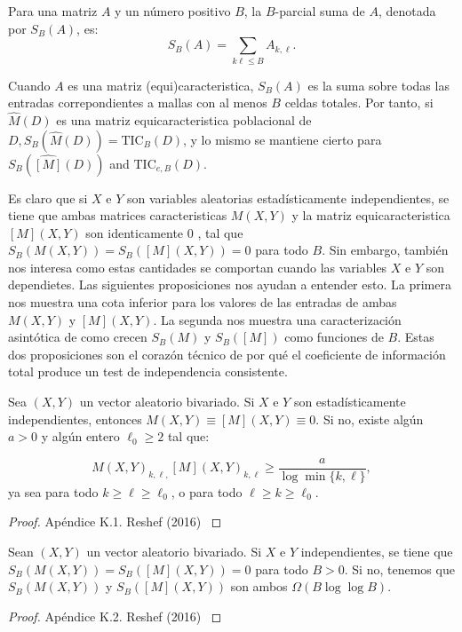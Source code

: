         \begin{defn}
            Para una matriz $A$	y un n\'umero positivo $B$, la $B$-parcial suma de 	$A$, denotada por  $S_B(A)$, es:
            $$
            S_B(A)=\sum_{k \ell \leq B} A_{k, \ell}.
            $$
            
            Cuando $A$ es una matriz (equi)caracteristica, $S_B(A)$ es la suma sobre todas las entradas correpondientes a mallas con al menos $B$ celdas totales. Por tanto, si $\widehat{M}(D)$ es una matriz equicaracteristica poblacional de $D, S_B(\widehat{M}(D))=\mathrm{TIC}_B(D)$, y lo mismo se mantiene cierto para $S_B(\widehat{[M]}(D))$ and $\mathrm{TIC}_{e, B}(D)$.
            
            Es claro que si $X$ e $Y$ son variables aleatorias estad\'isticamente independientes, se tiene que ambas matrices caracteristicas $M(X, Y)$ y la matriz equicaracteristica $[M](X, Y)$ son identicamente 0 , tal que $S_B(M(X, Y))=S_B([M](X, Y))=0$ para todo $B$. Sin embargo, tambi\'en nos interesa como estas cantidades se comportan cuando las variables $X$ e $Y$ son dependietes. Las siguientes proposiciones nos ayudan a entender esto. La primera nos muestra una cota inferior para los valores de las entradas de ambas $M(X, Y)$ y $[M](X, Y)$. La segunda nos muestra una caracterizaci\'on asint\'otica de como crecen $S_B(M)$ y $S_B([M])$ como funciones de $B$. Estas dos proposiciones son el coraz\'on t\'ecnico de por qu\'e el coeficiente de informaci\'on total produce un test de independencia consistente.
            
            \begin{prop}
                Sea $(X, Y)$ un vector aleatorio bivariado. Si $X$ e $Y$ son estad\'isticamente independientes, entonces $M(X, Y) \equiv[M](X, Y) \equiv 0$. Si no, existe alg\'un $a>0$ y alg\'un entero $\ell_0 \geq 2$ tal que:
                
                $$
                M(X, Y)_{k, \ell,}[M](X, Y)_{k, \ell} \geq \frac{a}{\log \min \{k, \ell\}},
                $$
                ya sea para todo $k \geq \ell \geq \ell_0$, o para todo $\ell \geq k \geq \ell_0$.
            \end{prop}
            \begin{proof}
                Ap\'endice K.1. Reshef (2016) \cite{Reshef2016}
            \end{proof}
            \begin{prop}
                Sean $(X, Y)$ un vector aleatorio bivariado. Si $X$ e $Y$ independientes, se tiene que  $S_B(M(X, Y))=S_B([M](X, Y))=0$ para todo $B>0$. Si no, tenemos que $S_B(M(X, Y))$ y $S_B([M](X, Y))$ son ambos $\Omega(B \log \log B)$.
            \end{prop}
            \begin{proof}
                Ap\'endice K.2. Reshef (2016) \cite{Reshef2016}
            \end{proof}
    

\end{defn}
